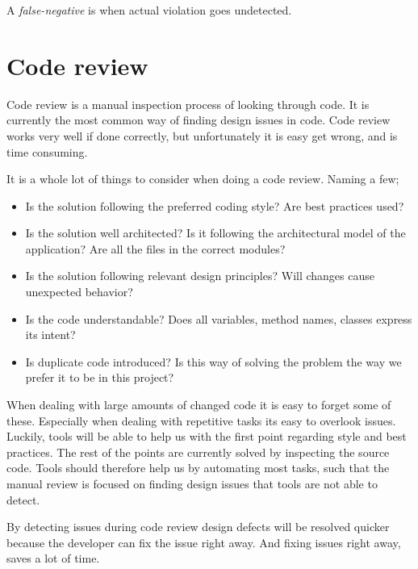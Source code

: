 \documentclass{report}
\begin{document}
A \textit{false-negative} is when actual violation goes undetected. 



\section{Code review}
\label{code-review}
Code review is a manual inspection process of looking through code. It is currently the most common way of finding design issues in code. Code review works very well if done correctly, but unfortunately it is easy get wrong, and is time consuming. 

It is a whole lot of things to consider when doing a code review. Naming a few;

\begin{itemize}
    \item Is the solution following the preferred coding style? Are best practices used?
    \item Is the solution well architected? Is it following the architectural model of the application? Are all the files in the correct modules?
    \item Is the solution following relevant design principles? Will changes cause unexpected behavior? 
    \item Is the code understandable? Does all variables, method names, classes express its intent?
    \item Is duplicate code introduced? Is this way of solving the problem the way we prefer it to be in this project?
\end{itemize}

When dealing with large amounts of changed code it is easy to forget some of these. Especially when dealing with repetitive tasks its easy to overlook issues. Luckily, tools will be able to help us with the first point regarding style and best practices. The rest of the points are currently solved by inspecting the source code. Tools should therefore help us by automating most tasks, such that the manual review is focused on finding design issues that tools are not able to detect. 

By detecting issues during code review design defects will be resolved quicker because the developer can fix the issue right away. And fixing issues right away, saves a lot of time. 
\end{document}
